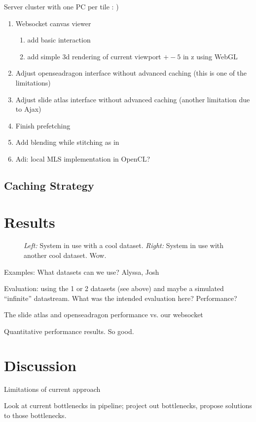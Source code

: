\documentclass{llncs}
\begin{document}
Server cluster with one PC per tile :  )

\begin{enumerate}
\item Websocket canvas viewer
	\begin{enumerate}
	\item add basic interaction
	\item add simple 3d rendering of current viewport $+-5$ in z using WebGL
	\end{enumerate}
\item Adjust openseadragon interface without advanced caching (this is one of the limitations)
\item Adjust slide atlas interface without advanced caching (another limitation due to Ajax)
\item Finish prefetching
\item Add blending while stitching as in 
\item Adi: local MLS implementation in OpenCL?
\end{enumerate}

\subsection{Caching Strategy}


\section{Results}

\begin{figure}
\caption{\emph{Left:} System in use with a cool dataset. \emph{Right:} System in use with another cool dataset. Wow.}
\end{figure}

Examples: What datasets can we use? Alyssa, Josh

Evaluation: using the 1 or 2 datasets (see above) and maybe a simulated “infinite” datastream. What was the intended evaluation here? Performance?

The slide atlas and openseadragon performance vs. our websocket

\begin{table}
\caption{Quantitative performance results. So good.}
\end{table}


\section{Discussion}

Limitations of current approach

Look at current bottlenecks in pipeline; project out bottlenecks, propose solutions to those bottlenecks.


%
%
\begin{thebibliography}{}

\end{thebibliography}
\end{document}
